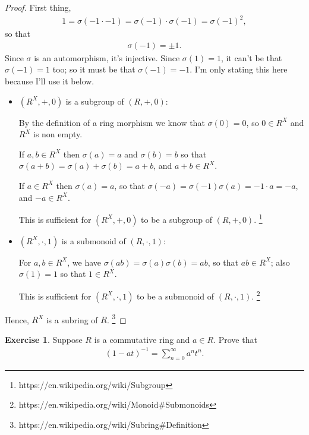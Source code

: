 \documentclass[12pt]{extarticle}
\newcommand{\<}{\langle}
\renewcommand{\>}{\rangle}
\theoremstyle{definition}
\newtheorem{exercise}{Exercise}
\begin{document}
\begin{proof}
  First thing,
  \begin{align*}
    1 = \sigma(-1 \cdot -1) = \sigma(-1) \cdot \sigma(-1) = \sigma(-1)^2,
  \end{align*}
  so that
  \begin{align*}
    \sigma(-1) = \pm 1.
  \end{align*}
  Since $\sigma$ is an automorphism, it's injective. Since $\sigma(1) = 1$, it can't be that $\sigma(-1)=1$ too; so it must be that $\sigma(-1)=-1$. I'm only stating this here because I'll use it below. 
  
  \begin{itemize}
  \item
    $(R^X, +, 0)$ is a subgroup of $(R,+,0)$:

    By the definition of a ring morphism we know that $\sigma(0)=0$, so $0 \in R^X$ and $R^X$ is non empty. 

    If $a,b \in R^X$ then $\sigma(a)=a$ and $\sigma(b)=b$ so that $\sigma(a+b) = \sigma(a) + \sigma(b) = a + b$, and $a+b \in R^X$.

    If $a \in R^X$ then $\sigma(a)=a$, so that $\sigma(-a) = \sigma(-1)\sigma(a) = -1 \cdot a = -a$, and $-a \in R^X$.

    This is sufficient for $(R^X,+,0)$ to be a subgroup of $(R,+,0)$. \footnote{https://en.wikipedia.org/wiki/Subgroup}
  \item
    $(R^X, \cdot, 1)$ is a submonoid of $(R,\cdot,1)$:

    For $a,b \in R^X$, we have $\sigma(ab) = \sigma(a)\sigma(b) = ab$, so that $ab \in R^X$; also $\sigma(1) = 1$ so that $1 \in R^X$.

    This is sufficient for $(R^X,\cdot,1)$ to be a submonoid of $(R,\cdot,1)$. \footnote{https://en.wikipedia.org/wiki/Monoid#Submonoids}
  \end{itemize}
  Hence, $R^X$ is a subring of $R$. \footnote{https://en.wikipedia.org/wiki/Subring#Definition}

\end{proof}
\begin{exercise}
  Suppose $R$ is a commutative ring and $a \in R$. Prove that
  \begin{align*}
    (1-at)^{-1} = \sum\limits_{n=0}^{\infty} a^n t^n.
  \end{align*}
\end{exercise}
\end{document}
